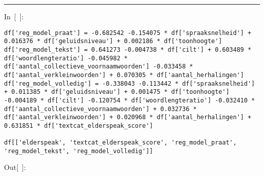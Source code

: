 \documentclass[
]{article}
\begin{document}
\begin{center}\rule{0.5\linewidth}{0.5pt}\end{center}

In~{[}~{]}:

\begin{verbatim}
df['reg_model_praat'] = -0.682542 -0.154075 * df['spraaksnelheid'] + 0.016376 * df['geluidsniveau'] + 0.002186 * df['toonhoogte']
df['reg_model_tekst'] = 0.641273 -0.004738 * df['cilt'] + 0.603489 * df['woordlengteratio'] -0.045982 * df['aantal_collectieve_voornaamwoorden'] -0.033458 * df['aantal_verkleinwoorden'] + 0.070305 * df['aantal_herhalingen']
df['reg_model_volledig'] = -0.338043 -0.113442 * df['spraaksnelheid'] + 0.011385 * df['geluidsniveau'] + 0.001475 * df['toonhoogte'] -0.004189 * df['cilt'] -0.120754 * df['woordlengteratio'] -0.032410 * df['aantal_collectieve_voornaamwoorden'] + 0.032736 * df['aantal_verkleinwoorden'] + 0.020968 * df['aantal_herhalingen'] + 0.631851 * df['textcat_elderspeak_score']         

df[['elderspeak', 'textcat_elderspeak_score', 'reg_model_praat', 'reg_model_tekst', 'reg_model_volledig']]
\end{verbatim}

Out{[}~{]}:
\end{document}
